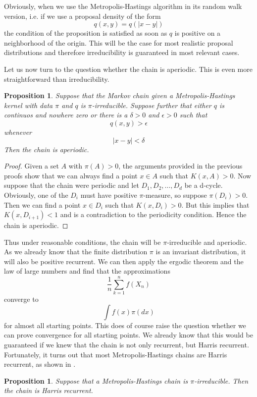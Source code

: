 \documentclass[a4paper, draft]{article}
\theoremstyle{own}
\newtheorem{prop}[thm]{Proposition}
\theoremstyle{remark}
\begin{document}
Obviously, when we use the Metropolis-Hastings algorithm in its random walk version, i.e. if we use a proposal density of the form
$$
q(x,y) = q(|x  - y|)
$$
the condition of the proposition is satisfied as soon as $q$ is positive on a neighborhood of the origin. This will be the case for most realistic proposal distributions and therefore irreducibility is guaranteed in most relevant cases. 

Let us now turn to the question whether the chain is aperiodic. This is even more straightforward than irreducibility.

\begin{prop}
	Suppose that the Markov chain given a Metropolis-Hastings kernel with data $\pi$ and $q$ is $\pi$-irreducible. Suppose further that either $q$ is continuos and nowhere zero or 
	there is a $\delta > 0$ and $\epsilon > 0$ such that
	$$
	q(x,y) > \epsilon
	$$
	whenever 
	$$
	| x - y | < \delta
	$$ 
	Then the chain is aperiodic.
\end{prop}

\begin{proof}
	Given a set $A$ with $\pi(A) > 0$, the arguments provided in the previous proofs show that we can always find a point $x \in A$ such that $K(x,A) > 0$. Now suppose that the chain were periodic and let $D_1, D_2, \dots, D_d$ be a d-cycle. Obviously, one of the $D_i$ must have positive $\pi$-measure, so suppose $\pi(D_i) > 0$. Then we can find a point $x \in D_i$ such that
	$K(x,D_i) > 0$. But this implies that $K(x,D_{i+1}) < 1$ and is a contradiction to the periodicity condition. Hence the chain is aperiodic.
\end{proof}

Thus under reasonable conditions, the chain will be $\pi$-irreducible and aperiodic. As we already know that the finite distribution $\pi$ is an invariant distribution, it will also be positive recurrent. We can then apply the ergodic theorem and the law of large numbers and find that the approximations
$$
\frac{1}{n} \sum_{k=1}^n f(X_n)
$$
converge to
$$
\int f(x) \pi(dx)
$$
for almost all starting points. This does of course raise the question whether we can prove convergence for all starting points. We already know that this would be guaranteed if we knew that the chain is not only recurrent, but Harris recurrent. Fortunately, it turns out that most Metropolis-Hastings chains are Harris recurrent, as shown in \cite{Tierney1994}. 

\begin{prop}
	Suppose that a Metropolis-Hastings chain is $\pi$-irreducible. Then the chain is Harris recurrent.
\end{prop}
\end{document}
